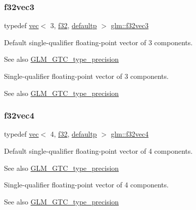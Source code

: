 \subsubsection{\texorpdfstring{f32vec3}{f32vec3}}
{\footnotesize\ttfamily typedef \mbox{\hyperlink{structglm_1_1vec}{vec}}$<$ 3, \mbox{\hyperlink{group__gtc__type__precision_ga0ec999b57f5330d9021256e96038df04}{f32}}, \mbox{\hyperlink{namespaceglm_a36ed105b07c7746804d7fdc7cc90ff25a9d21ccd8b5a009ec7eb7677befc3bf51}{defaultp}} $>$ \mbox{\hyperlink{group__gtc__type__precision_ga4d08db2a75d1e8f85e0edbbd76f18ecf}{glm\+::f32vec3}}}

Default single-\/qualifier floating-\/point vector of 3 components. \begin{DoxySeeAlso}{See also}
\mbox{\hyperlink{group__gtc__type__precision}{G\+L\+M\+\_\+\+G\+T\+C\+\_\+type\+\_\+precision}}
\end{DoxySeeAlso}
Single-\/qualifier floating-\/point vector of 3 components. \begin{DoxySeeAlso}{See also}
\mbox{\hyperlink{group__gtc__type__precision}{G\+L\+M\+\_\+\+G\+T\+C\+\_\+type\+\_\+precision}} 
\end{DoxySeeAlso}
\mbox{\label{group__gtc__type__precision_ga03e165a8b1ffe77625530fa335699e06}} 
\subsubsection{\texorpdfstring{f32vec4}{f32vec4}}
{\footnotesize\ttfamily typedef \mbox{\hyperlink{structglm_1_1vec}{vec}}$<$ 4, \mbox{\hyperlink{group__gtc__type__precision_ga0ec999b57f5330d9021256e96038df04}{f32}}, \mbox{\hyperlink{namespaceglm_a36ed105b07c7746804d7fdc7cc90ff25a9d21ccd8b5a009ec7eb7677befc3bf51}{defaultp}} $>$ \mbox{\hyperlink{group__gtc__type__precision_ga03e165a8b1ffe77625530fa335699e06}{glm\+::f32vec4}}}

Default single-\/qualifier floating-\/point vector of 4 components. \begin{DoxySeeAlso}{See also}
\mbox{\hyperlink{group__gtc__type__precision}{G\+L\+M\+\_\+\+G\+T\+C\+\_\+type\+\_\+precision}}
\end{DoxySeeAlso}
Single-\/qualifier floating-\/point vector of 4 components. \begin{DoxySeeAlso}{See also}
\mbox{\hyperlink{group__gtc__type__precision}{G\+L\+M\+\_\+\+G\+T\+C\+\_\+type\+\_\+precision}} 
\end{DoxySeeAlso}
\mbox{\label{group__gtc__type__precision_ga2bba392e555124b36cde6abba349bab3}} 
